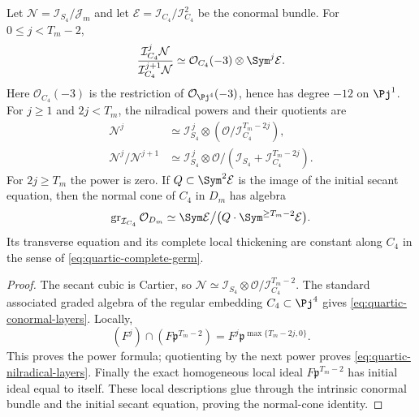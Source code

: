 \begin{corollary}
\label{cor:quartic-infinitesimal-layers}
Let $\mathcal N=\mathcal I_{S_4}/\mathcal J_m$ and let
$\mathcal E=\mathcal I_{C_4}/\mathcal I_{C_4}^2$ be the conormal
bundle. For $0\le j<T_m-2$,
\begin{equation}\label{eq:quartic-conormal-layers}
 \frac{\mathcal I_{C_4}^j\mathcal N}
      {\mathcal I_{C_4}^{j+1}\mathcal N}
 \simeq
 \mathcal O_{C_4}(-3)\otimes\Sym^j\mathcal E.
\end{equation}
Here $\mathcal O_{C_4}(-3)$ is the restriction of
$\mathcal O_{\Pj^4}(-3)$, hence has degree $-12$ on $\Pj^1$.
For $j\ge1$ and $2j<T_m$, the nilradical powers and their quotients
are
\begin{align}
 \mathcal N^j
 &\simeq\mathcal I_{S_4}^{\,j}\otimes
              (\mathcal O/\mathcal I_{C_4}^{T_m-2j}),
              \label{eq:quartic-nilradical-powers}\\
 \mathcal N^j/\mathcal N^{j+1}
 &\simeq\mathcal I_{S_4}^{\,j}\otimes
       \mathcal O/(\mathcal I_{S_4}+\mathcal I_{C_4}^{T_m-2j}).
              \label{eq:quartic-nilradical-layers}
\end{align}
For $2j\ge T_m$ the power is zero. If
$Q\subset\Sym^2\mathcal E$ is the image of the initial secant
equation, then the normal cone of $C_4$ in $D_m$ has algebra
\begin{equation}\label{eq:quartic-normal-cone}
 \operatorname{gr}_{\mathcal I_{C_4}}\mathcal O_{D_m}
  \simeq \Sym\mathcal E\big/
       \big(Q\cdot\Sym^{\ge T_m-2}\mathcal E\big).
\end{equation}
Its transverse equation and its complete local thickening are
constant along $C_4$ in the sense of \eqref{eq:quartic-complete-germ}.
\end{corollary}
\begin{proof}
The secant cubic is Cartier, so
$\mathcal N\simeq\mathcal I_{S_4}\otimes
\mathcal O/\mathcal I_{C_4}^{T_m-2}$. The standard associated graded
algebra of the regular embedding $C_4\subset\Pj^4$ gives
\eqref{eq:quartic-conormal-layers}. Locally,
\[
 (F^j)\cap(F\mathfrak p^{T_m-2})
      =F^j\mathfrak p^{\max\{T_m-2j,0\}}.
\]
This proves the power formula; quotienting by the next power proves
\eqref{eq:quartic-nilradical-layers}. Finally the exact homogeneous
local ideal $F\mathfrak p^{T_m-2}$ has initial ideal equal to
itself. These local descriptions glue through the intrinsic
conormal bundle and the initial secant equation, proving the
normal-cone identity.
\end{proof}
